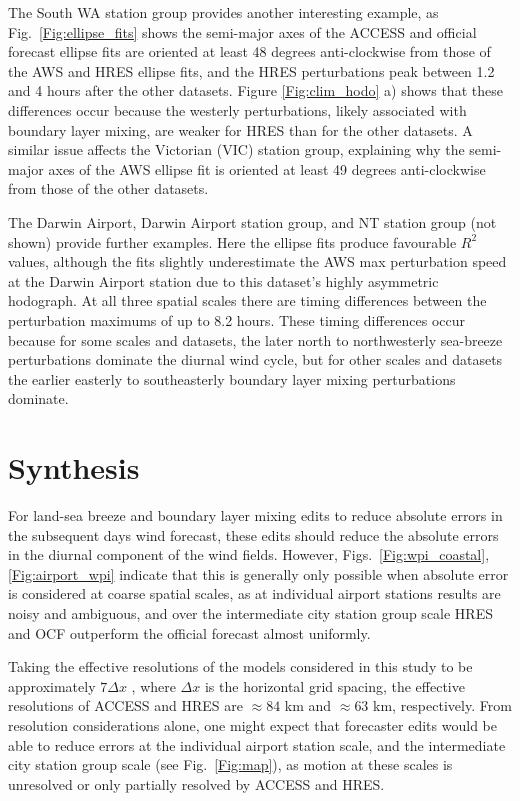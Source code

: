 \documentclass[twocol]{ametsoc}
\begin{document}
The South WA station group provides another interesting example, as Fig.~\ref{Fig:ellipse_fits} shows the semi-major axes of the ACCESS and official forecast ellipse fits are oriented at least 48 degrees anti-clockwise from those of the AWS and HRES ellipse fits, and the HRES perturbations peak between 1.2 and 4 hours after the other datasets. Figure \ref{Fig:clim_hodo} a) shows that these differences occur because the westerly perturbations, likely associated with boundary layer mixing, are weaker for HRES than for the other datasets. A similar issue affects the Victorian (VIC) station group, explaining why the semi-major axes of the AWS ellipse fit is oriented at least 49 degrees anti-clockwise from those of the other datasets. 

The Darwin Airport, Darwin Airport station group, and NT station group (not shown) provide further examples. Here the ellipse fits produce favourable $R^2$ values, although the fits slightly underestimate the AWS max perturbation speed at the Darwin Airport station due to this dataset's highly asymmetric hodograph. At all three spatial scales there are timing differences between the perturbation maximums of up to 8.2 hours. These timing differences occur because for some scales and datasets, the later north to northwesterly sea-breeze perturbations dominate the diurnal wind cycle, but for other scales and datasets the earlier easterly to southeasterly boundary layer mixing perturbations dominate.

\section{Synthesis}
\label{Sec:Discussion}
For land-sea breeze and boundary layer mixing edits to reduce absolute errors in the subsequent days wind forecast, these edits should reduce the absolute errors in the diurnal component of the wind fields. However, Figs.~\ref{Fig:wpi_coastal},\ref{Fig:airport_wpi} indicate that this is generally only possible when absolute error is considered at coarse spatial scales, as at individual airport stations results are noisy and ambiguous, and over the intermediate city station group scale HRES and OCF outperform the official forecast almost uniformly.

Taking the effective resolutions of the models considered in this study to be approximately $7\Delta x$ \citep[e.g.][]{skamarock04, abdalla13}, where $\Delta x$ is the horizontal grid spacing, the effective resolutions of ACCESS and HRES are $\approx 84$ km and $\approx 63$ km, respectively. From resolution considerations alone, one might expect that forecaster edits would be able to reduce errors at the individual airport station scale, and the intermediate city station group scale (see Fig.~\ref{Fig:map}), as motion at these scales is unresolved or only partially resolved by ACCESS and HRES.
\end{document}
